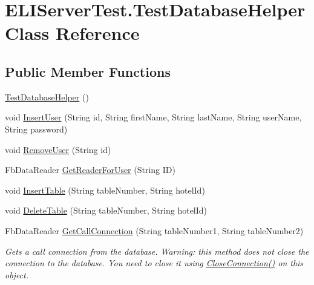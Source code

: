\hypertarget{class_e_l_i_server_test_1_1_test_database_helper}{}\section{E\+L\+I\+Server\+Test.\+Test\+Database\+Helper Class Reference}
\label{class_e_l_i_server_test_1_1_test_database_helper}
\subsection*{Public Member Functions}
\begin{DoxyCompactItemize}
\item 
\hyperlink{class_e_l_i_server_test_1_1_test_database_helper_a155438b527497514f6e5fcb8c691b865}{Test\+Database\+Helper} ()
\item 
void \hyperlink{class_e_l_i_server_test_1_1_test_database_helper_a612fe6345fb2c6d90f03f1c2be6c0901}{Insert\+User} (String id, String first\+Name, String last\+Name, String user\+Name, String password)
\item 
void \hyperlink{class_e_l_i_server_test_1_1_test_database_helper_a21316fbecb748d3f5d9446387951c870}{Remove\+User} (String id)
\item 
Fb\+Data\+Reader \hyperlink{class_e_l_i_server_test_1_1_test_database_helper_a82181a75035efca85bacd09a8cf8aec9}{Get\+Reader\+For\+User} (String ID)
\item 
void \hyperlink{class_e_l_i_server_test_1_1_test_database_helper_acce24ced899bd0c952ac41a1a2657491}{Insert\+Table} (String table\+Number, String hotel\+Id)
\item 
void \hyperlink{class_e_l_i_server_test_1_1_test_database_helper_ae1410bc73e460822726be9e02a46fd3c}{Delete\+Table} (String table\+Number, String hotel\+Id)
\item 
Fb\+Data\+Reader \hyperlink{class_e_l_i_server_test_1_1_test_database_helper_a1e968d24b2cf40006b6740905f408b1c}{Get\+Call\+Connection} (String table\+Number1, String table\+Number2)
\begin{DoxyCompactList}\small\item\em Gets a call connection from the database. Warning\+: this method does not close the connection to the database. You need to close it using \hyperlink{class_e_l_i_server_test_1_1_test_database_helper_ae1ec2aaa4d83ed9f63a02844ec32600e}{Close\+Connection()} on this object. \end{DoxyCompactList}\item 

\end{DoxyCompactItemize}
